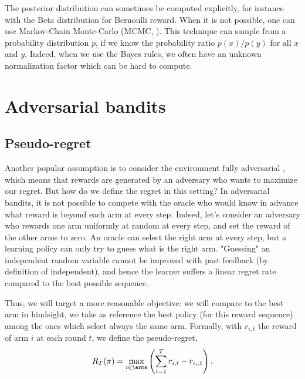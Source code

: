 {The posterior distribution can sometimes be computed explicitly, for instance with the Beta distribution for Bernoulli reward. When it is not possible, one can use Markov-Chain Monte-Carlo (MCMC, \citet{andrieu2003introduction}). This technique can sample from a probability distribution $p$, if we know the probability ratio $p(x)/p(y)$ for all $x$ and $y$. Indeed, when we use the Bayes rules, we often have an unknown normalization factor which can be hard to compute.
 

\section{Adversarial bandits}
\label{sec:adv-bandits}
\subsection{Pseudo-regret}
Another popular assumption is to consider the environment fully adversarial \citep{auer2002nonstochastic}, which means that rewards are generated by an adversary who wants to maximize our regret. But how do we define the regret in this setting? In adversarial bandits, it is not possible to compete with the oracle who would know in advance what reward is beyond each arm at every step. Indeed, let's consider an adversary who rewards one arm uniformly at random at every step, and set the reward of the other arms to zero. An oracle can select the right arm at every step, but a learning policy can only try to guess what is the right arm. "Guessing" an independent random variable cannot be improved with past feedback (by definition of independent), and hence the learner suffers a linear regret rate compared to the best possible sequence.

Thus,  we will target a more reasonable objective: we will compare to the best arm in hindsight, \ie we take as reference the best policy (for this reward sequence) among the ones which select always the same arm. Formally, with $r_{i,t}$ the reward of arm $i$ at each round $t$, we define the pseudo-regret,
\[
R_T(\pi) = \max_{i \in \arms} \left( \sum_{t=1}^T  r_{i,t} - r_{i_t,t}\right).
\]

}
